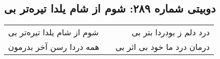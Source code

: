 \begin{center}
\section*{دوبیتی شماره ۲۸۹: شوم از شام یلدا تیره‌تر بی}
\label{sec:289}
\begin{longtable}{l p{0.5cm} r}
شوم از شام یلدا تیره‌تر بی
&&
درد دلم ز بودردا بتر بی
\\
همه دردا رسن آخر بدرمون
&&
درمان درد ما خود بی اثر بی
\\
\end{longtable}
\end{center}
